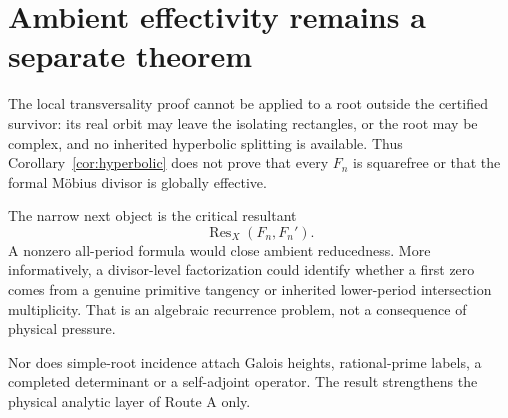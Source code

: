 \section{Ambient effectivity remains a separate theorem}

The local transversality proof cannot be applied to a root outside the
certified survivor: its real orbit may leave the isolating rectangles, or the
root may be complex, and no inherited hyperbolic splitting is available.
Thus Corollary~\ref{cor:hyperbolic} does not prove that every $F_n$ is
squarefree or that the formal M\"obius divisor is globally effective.

The narrow next object is the critical resultant
\[
\operatorname{Res}_X(F_n,F_n').
\]
A nonzero all-period formula would close ambient reducedness.  More
informatively, a divisor-level factorization could identify whether a first
zero comes from a genuine primitive tangency or inherited lower-period
intersection multiplicity.  That is an algebraic recurrence problem, not a
consequence of physical pressure.

Nor does simple-root incidence attach Galois heights, rational-prime labels,
a completed determinant or a self-adjoint operator.  The result strengthens
the physical analytic layer of Route A only.
